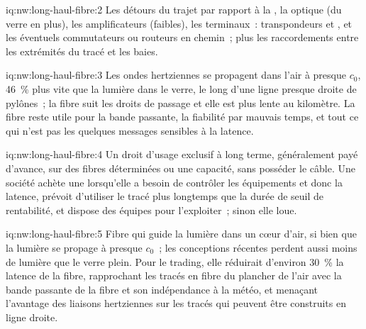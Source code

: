 \begin{solution}{iq:nw:long-haul-fibre:2}
Les détours du trajet par rapport à la , la  optique (du verre en plus), les amplificateurs (faibles), les terminaux~: transpondeurs et
, et les éventuels commutateurs ou routeurs en chemin~; plus les raccordements entre les extrémités du tracé et les baies.
\end{solution}

\begin{solution}{iq:nw:long-haul-fibre:3}
Les ondes hertziennes se propagent dans l'air à presque $c_0$, 46~\% plus vite que la lumière dans le verre, le long d'une ligne presque droite de pylônes~; la fibre suit les droits de passage
et elle est plus lente au kilomètre. La fibre reste utile pour la bande passante, la fiabilité par mauvais temps, et tout ce qui n'est pas
les quelques messages sensibles à la latence.
\end{solution}

\begin{solution}{iq:nw:long-haul-fibre:4}
Un droit d'usage exclusif à long terme, généralement payé d'avance, sur des fibres déterminées ou une capacité, sans posséder le câble. Une société achète une  lorsqu'elle a besoin
de contrôler les équipements et donc la latence, prévoit d'utiliser le tracé plus longtemps que la durée de seuil de rentabilité, et dispose des équipes pour l'exploiter~;
sinon elle loue.
\end{solution}

\begin{solution}{iq:nw:long-haul-fibre:5}
Fibre qui guide la lumière dans un cœur d'air, si bien que la lumière se propage à presque $c_0$~; les conceptions récentes perdent aussi moins de lumière que le verre plein. Pour le trading, elle
réduirait d'environ 30~\% la latence de la fibre, rapprochant les tracés en fibre du plancher de l'air avec la bande passante de la fibre et son indépendance à la météo, et
menaçant l'avantage des liaisons hertziennes sur les tracés qui peuvent être construits en ligne droite.
\end{solution}

